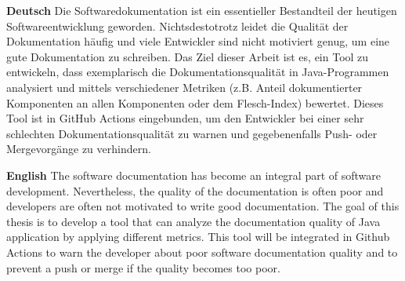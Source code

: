 \textbf{Deutsch}
Die Softwaredokumentation ist ein essentieller Bestandteil der heutigen Softwareentwicklung geworden. Nichtsdestotrotz leidet die Qualität der Dokumentation häufig und viele Entwickler sind nicht motiviert genug, um eine gute Dokumentation zu schreiben. Das Ziel dieser Arbeit ist es, ein Tool zu entwickeln, dass exemplarisch die Dokumentationsqualität in Java-Programmen analysiert und mittels verschiedener Metriken (z.B. Anteil dokumentierter Komponenten an allen Komponenten oder dem Flesch-Index) bewertet. Dieses Tool ist in GitHub Actions eingebunden, um den Entwickler bei einer sehr schlechten Dokumentationsqualität zu warnen und gegebenenfalls Push- oder Mergevorgänge zu verhindern.

\bigskip

\noindent
\textbf{English} 
The software documentation has become an integral part of software development. Nevertheless, the quality of the documentation is often poor and developers are often not motivated to write good documentation. The goal of this thesis is to develop a tool that can analyze the documentation quality of Java application by applying different metrics. This tool will be integrated in Github Actions to warn the developer about poor software documentation quality and to prevent a push or merge if the quality becomes too poor.  


